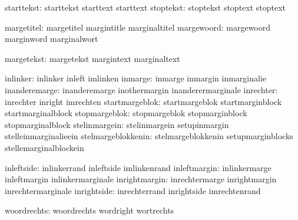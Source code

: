                    starttekst:  starttekst                   starttext
                                starttext
                    stoptekst:  stoptekst                    stoptext
                                stoptext

                   margetitel:  margetitel                   margintitle
                                marginaltitel
                   margewoord:  margewoord                   marginword
                                marginalwort


                   margetekst:  margetekst                   margintext
                                marginaltext

                     inlinker:  inlinker                     inleft
                                imlinken
                      inmarge:  inmarge                      inmargin
                                inmarginalie
                inanderemarge:  inanderemarge                inothermargin
                                inanderermarginale
                    inrechter:  inrechter                    inright
                                imrechten
               startmargeblok:  startmargeblok               startmarginblock
                                startmarginalblock
                stopmargeblok:  stopmargeblok                stopmarginblock
                                stopmarginalblock
                stelinmargein:  stelinmargein                setupinmargin
                                stelleinmarginalieein
           stelmargeblokkenin:  stelmargeblokkenin           setupmarginblocks
                                stellemarginalblockein

                   inleftside:  inlinkerrand                 inleftside
                                imlinkenrand
                 inleftmargin:  inlinkermarge                inleftmargin
                                inlinkermarginale
                inrightmargin:  inrechtermarge               inrightmargin
                                inrechtermarginale
                  inrightside:  inrechterrand                inrightside
                                imrechtenrand

                  woordrechts:  woordrechts                  wordright
                                wortrechts

